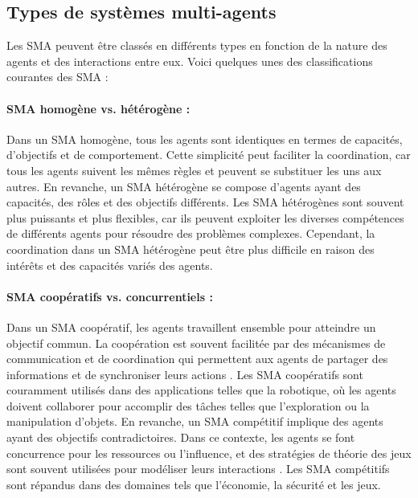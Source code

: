 \subsection{Types de systèmes multi-agents}

Les SMA peuvent être classés en différents types en fonction de la nature des agents et des interactions entre eux. Voici quelques unes des classifications courantes des SMA :

\paragraph{SMA homogène vs. hétérogène :}
Dans un SMA homogène, tous les agents sont identiques en termes de capacités, d'objectifs et de comportement. Cette simplicité peut faciliter la coordination, car tous les agents suivent les mêmes règles et peuvent se substituer les uns aux autres. En revanche, un SMA hétérogène se compose d'agents ayant des capacités, des rôles et des objectifs différents. Les SMA hétérogènes sont souvent plus puissants et plus flexibles, car ils peuvent exploiter les diverses compétences de différents agents pour résoudre des problèmes complexes. Cependant, la coordination dans un SMA hétérogène peut être plus difficile en raison des intérêts et des capacités variés des agents.

\paragraph{SMA coopératifs vs. concurrentiels :}
Dans un SMA coopératif, les agents travaillent ensemble pour atteindre un objectif commun. La coopération est souvent facilitée par des mécanismes de communication et de coordination qui permettent aux agents de partager des informations et de synchroniser leurs actions \cite{falco2020tendencies}. Les SMA coopératifs sont couramment utilisés dans des applications telles que la robotique, où les agents doivent collaborer pour accomplir des tâches telles que l'exploration ou la manipulation d'objets. En revanche, un SMA compétitif implique des agents ayant des objectifs contradictoires. Dans ce contexte, les agents se font concurrence pour les ressources ou l'influence, et des stratégies de théorie des jeux sont souvent utilisées pour modéliser leurs interactions \cite{shoham2008multiagent}. Les SMA compétitifs sont répandus dans des domaines tels que l'économie, la sécurité et les jeux.

